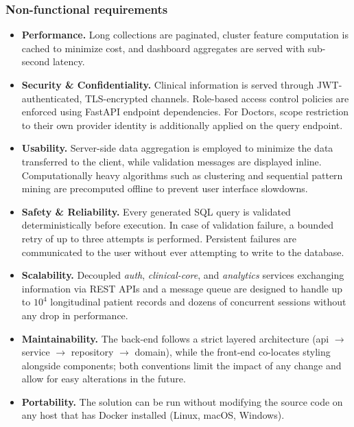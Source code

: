 \subsubsection*{Non-functional requirements}
\begin{itemize}
    \item \textbf{Performance.} Long collections are paginated, cluster feature computation is cached to minimize cost, and dashboard aggregates are served with sub-second latency.
    \item \textbf{Security \& Confidentiality.} Clinical information is served through JWT-authenticated, TLS-encrypted channels. Role-based access control policies are enforced using FastAPI endpoint dependencies. For Doctors, scope restriction to their own provider identity is additionally applied on the query endpoint.
    \item \textbf{Usability.} Server-side data aggregation is employed to minimize the data transferred to the client, while validation messages are displayed inline. Computationally heavy algorithms such as clustering and sequential pattern mining are precomputed offline to prevent user interface slowdowns.
    \item \textbf{Safety \& Reliability.} Every generated SQL query is validated deterministically before execution. In case of validation failure, a bounded retry of up to three attempts is performed. Persistent failures are communicated to the user without ever attempting to write to the database.
    \item \textbf{Scalability.} Decoupled \emph{auth}, \emph{clinical-core}, and \emph{analytics} services exchanging information via REST APIs and a message queue are designed to handle up to $10^{4}$ longitudinal patient records and dozens of concurrent sessions without any drop in performance.
    \item \textbf{Maintainability.} The back-end follows a strict layered architecture (api $\rightarrow$ service $\rightarrow$ repository $\rightarrow$ domain), while the front-end co-locates styling alongside components; both conventions limit the impact of any change and allow for easy alterations in the future.
    \item \textbf{Portability.} The solution can be run without modifying the source code on any host that has Docker installed (Linux, macOS, Windows).
\end{itemize}